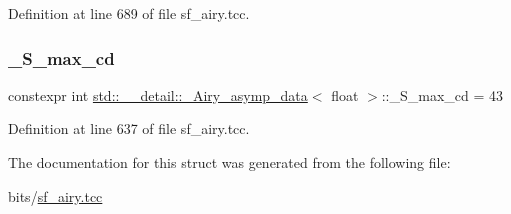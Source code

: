 Definition at line 689 of file sf\+\_\+airy.\+tcc.

\mbox{\label{structstd_1_1____detail_1_1__Airy__asymp__data_3_01float_01_4_ac0e59b83a90623587f20cdc32a9e7565}} 
\subsubsection{\texorpdfstring{\+\_\+\+S\+\_\+max\+\_\+cd}{\_S\_max\_cd}}
{\footnotesize\ttfamily constexpr int \hyperlink{structstd_1_1____detail_1_1__Airy__asymp__data}{std\+::\+\_\+\+\_\+detail\+::\+\_\+\+Airy\+\_\+asymp\+\_\+data}$<$ float $>$\+::\+\_\+\+S\+\_\+max\+\_\+cd = 43\hspace{0.3cm}{\ttfamily [static]}}



Definition at line 637 of file sf\+\_\+airy.\+tcc.



The documentation for this struct was generated from the following file\+:\begin{DoxyCompactItemize}
\item 
bits/\hyperlink{sf__airy_8tcc}{sf\+\_\+airy.\+tcc}\end{DoxyCompactItemize}
